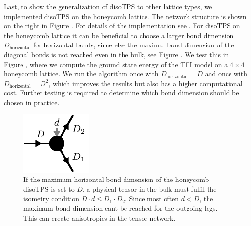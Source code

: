 %
Last, to show the generalization of disoTPS to other lattice types, we implemented disoTPS on the honeycomb lattice. The network structure is shown on the right in Figure . For details of the implementation see \cite{cite:github_disoTPS}. For disoTPS on the honeycomb lattice it can be beneficial to choose a larger bond dimension $D_\text{horizontal}$ for horizontal bonds, since else the maximal bond dimension of the diagonal bonds is not reached even in the bulk, see Figure . We test this in Figure , where we compute the ground state energy of the TFI model on a $4\times4$ honeycomb lattice. We run the algorithm once with $D_\text{horizontal} = D$ and once with $D_\text{horizontal} = D^2$, which improves the results but also has a higher computational cost. Further testing is required to determine which bond dimension should be chosen in practice.
\begin{figure}
	\centering
	\includegraphics[scale=1]{figures/tikz/TFI/hexagonal_lattice/hexagonal_lattice_horizontal_bond_problem.pdf}
	\caption{If the maximum horizontal bond dimension of the honeycomb disoTPS is set to $D$, a physical tensor in the bulk must fulfil the isometry condition $D\cdot d \le D_1\cdot D_2$. Since most often $d < D$, the maximum bond dimension cant be reached for the outgoing legs. This can create anisotropies in the tensor network.}
	\label{fig:honeycomb_horizontal_bond_problem}
\end{figure}